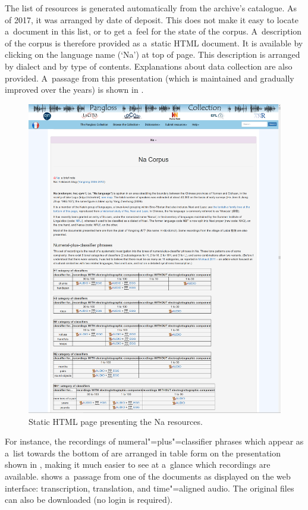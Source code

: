 The list of resources is generated automatically from the archive's catalogue. As of 2017, it was arranged by date of deposit. This does not make it easy to locate a~document in this list, or to get a~feel for the state of the corpus. A~description of the corpus is therefore provided as a~static HTML document. It is available by clicking on the language name (‘Na’) at top of page. This description is arranged by dialect and by type of contents. Explanations about data collection are also provided. A~passage from this presentation (which is maintained and gradually improved over the years) is shown in .
%
\begin{figure}  %
\includegraphics[width=\textwidth]{figures/ListOfResources.png}
\caption{Static HTML page presenting the Na resources.}
\label{fig:static}
\end{figure}
%
 For instance, the recordings of {numeral}"=plus"=classifier phrases which appear as a~list towards the bottom of  are arranged in table form on the presentation shown in , making it much easier to see at a~glance which recordings are available.  shows
a~passage from one of the documents as displayed on the web interface: transcription, translation, and time"=aligned audio. The original files can also be downloaded (no login is required). 




